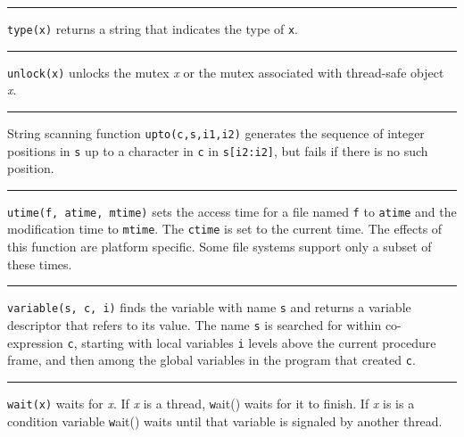 \bigskip\hrule\vspace{0.1cm}

\noindent
{}\texttt{type(x)} returns a string that indicates the type
of \texttt{x}.

\bigskip\hrule\vspace{0.1cm}

\noindent
{}\texttt{unlock(x)} unlocks the mutex {\textit x} or the mutex
associated with thread-safe object {\textit x}.

\bigskip\hrule\vspace{0.1cm}

\noindent
String scanning function \texttt{upto(c,s,i1,i2)}
generates the sequence of integer positions in \texttt{s} up to a
character in \texttt{c} in \texttt{s[i2:i2]}, but fails if there is no
such position.

\bigskip\hrule\vspace{0.1cm}

\noindent
\texttt{utime(f, atime, mtime)} sets the access
time for a file named \texttt{f} to \texttt{atime} and the modification
time to \texttt{mtime}. The \texttt{ctime} is set to the current time.
The effects of this function are platform specific. Some file systems
support only a subset of these times.

\bigskip\hrule\vspace{0.1cm}

\noindent
{}\texttt{variable(s, c, i)} finds the variable
with name \texttt{s} and returns a variable descriptor that refers to
its value. The name \texttt{s} is searched for within co-expression
\texttt{c}, starting with local variables \texttt{i} levels above the
current procedure frame, and then among the global variables in the
program that created \texttt{c}.

\bigskip\hrule\vspace{0.1cm}

\noindent
{}\texttt{wait(x)} waits for {\textit x}. If {\textit x} is
a thread, {\texttt wait()} waits for it to finish. If {\textit x} is
is a condition variable {\texttt wait()} waits until that variable is
signaled by another thread.


